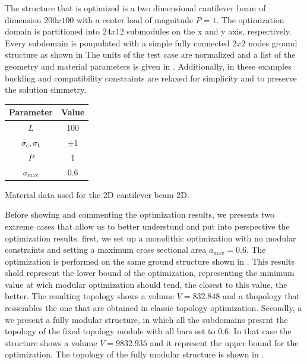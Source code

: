 The structure that is optimized is a two dimensional cantilever beam of dimension $200x100$ with a center load of magnitude $P=1$. The optimization domain is partitioned into $24x12$ submodules on the x and y axis, respectively. Every subdomain is poupulated with a simple fully connected $2x2$ nodes ground structure as shown in  The units of the test case are normalized and a list of the geometry and material parameters is given in . Additionally, in these examples buckling and compatibility constraints are relaxed for simplicity and to preserve the solution simmetry.

\begin{margintable}
    \small
    \centering
    \begin{tabular}{cc}
    \toprule
    \textbf{Parameter}        & \textbf{Value} \\ \midrule
    $L$              & 100     \\
    $\sigma_\text{c}, \sigma_\text{t}$ & $\pm 1$\\
    $P$              & 1   \\
    $a_\text{max}$              & 0.6   \\
    \bottomrule
    \end{tabular}
    \caption{Material data used for the 2D cantilever beam 2D.}
    \label{tab:06_modular_cant_data}
\end{margintable}

Before showing and commenting the optimization results, we presents two extreme cases that allow us to better understund and put into perspective the optimization results. first, we set up a monolithic optimization with no modular constraints and setting a maximum cross sectional area $a_\text{max}=0.6$. The optimization is performed on the same ground structure shown in . This results shold represent the lower bound of the optimization, representing the minimum value at wich modular optimization should tend, the closest to this value, the better. The resulting topology shows a volume $V=832.848$ and a thopology that ressembles the one that are obtained in classic topology optimization. Secondly, a we present a fully modular structure, in which all the subdomains presrnt the topology of the fixed topology module with all bars set to 0.6. In that case the structure shows a volume $V=9832.935$ and it represent the upper bound for the optimization. The topology of the fully modular structure is shown in .

